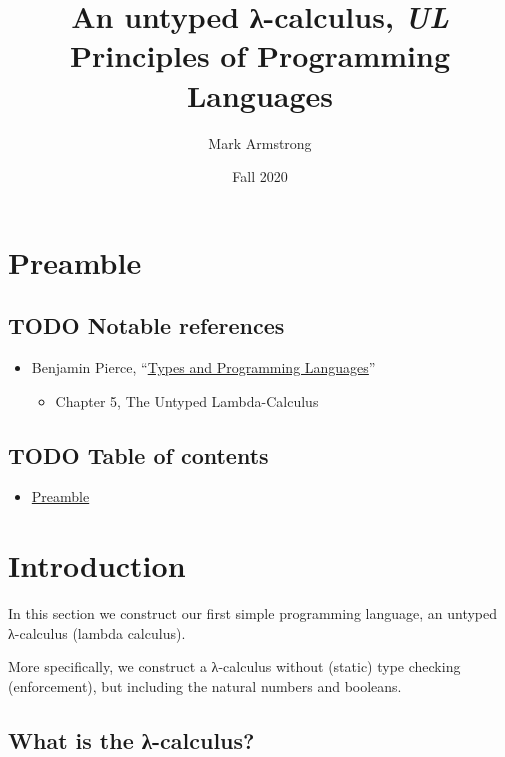 \documentclass[11pt]{article}
\author{Mark Armstrong}
\date{Fall 2020}
\title{An untyped λ-calculus, \emph{UL}\\\medskip
\large Principles of Programming Languages}
\theoremstyle{definition}
\begin{document}
\maketitle

\section{Preamble}
\label{sec:org38e6cd7}

\subsection{{\bfseries\sffamily TODO} Notable references}
\label{sec:org5ada612}

\begin{itemize}
\item Benjamin Pierce,
“\href{https://ebookcentral.proquest.com/lib/mcmu/detail.action?docID=3338823}{Types and Programming Languages}”
\begin{itemize}
\item Chapter 5, The Untyped Lambda-Calculus
\end{itemize}
\end{itemize}

\subsection{{\bfseries\sffamily TODO} Table of contents}
\label{sec:org2f61a25}

\begin{scriptsize}
\begin{itemize}
\item \hyperref[sec:org38e6cd7]{Preamble}
\end{itemize}
\end{scriptsize}

\section{Introduction}
\label{sec:org73bd817}

In this section we construct our first simple programming language,
an untyped λ-calculus (lambda calculus).

More specifically, we construct a λ-calculus
without (static) type checking (enforcement),
but including the natural numbers and booleans.

\subsection{What is the λ-calculus?}
\label{sec:org1161706}
\end{document}

